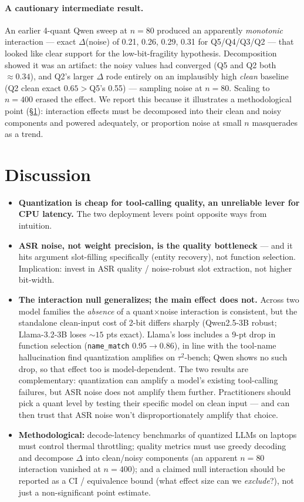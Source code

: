 \documentclass[11pt]{article}
\newcommand{\code}[1]{\texttt{#1}}
\begin{document}
\paragraph{A cautionary intermediate result.} An earlier 4-quant Qwen sweep at
$n{=}80$ produced an apparently \emph{monotonic} interaction --- exact $\Delta$(noise)
of 0.21, 0.26, 0.29, 0.31 for Q5/Q4/Q3/Q2 --- that looked like clear support for the
low-bit-fragility hypothesis. Decomposition showed it was an artifact: the noisy values
had converged (Q5 and Q2 both ${\approx}0.34$), and Q2's larger $\Delta$ rode entirely
on an implausibly high \emph{clean} baseline (Q2 clean exact $0.65 > {}$Q5's 0.55) ---
sampling noise at $n{=}80$. Scaling to $n{=}400$ erased the effect. We report this
because it illustrates a methodological point (\S\ref{sec:disc}): interaction effects
must be decomposed into their clean and noisy components and powered adequately, or
proportion noise at small $n$ masquerades as a trend.

\section{Discussion}
\label{sec:disc}
\begin{itemize}
\item \textbf{Quantization is cheap for tool-calling quality, an unreliable lever for
CPU latency.} The two deployment levers point opposite ways from intuition.
\item \textbf{ASR noise, not weight precision, is the quality bottleneck} --- and it
hits argument slot-filling specifically (entity recovery), not function selection.
Implication: invest in ASR quality / noise-robust slot extraction, not higher
bit-width.
\item \textbf{The interaction null generalizes; the main effect does not.} Across two
model families the \emph{absence} of a quant$\times$noise interaction is consistent, but
the standalone clean-input cost of 2-bit differs sharply (Qwen2.5-3B robust;
Llama-3.2-3B loses ${\sim}15$ pts exact). Llama's loss includes a 9-pt drop in
function selection (\code{name\_match} $0.95\rightarrow0.86$), in line with the
tool-name hallucination \citet{jang2026} find quantization amplifies on
$\tau^2$-bench; Qwen shows no such drop, so that effect too is model-dependent.
The two results are complementary: quantization can amplify a model's existing
tool-calling failures, but ASR noise does not amplify them further. Practitioners
should pick a quant level by
testing their specific model on clean input --- and can then trust that ASR noise won't
disproportionately amplify that choice.
\item \textbf{Methodological:} decode-latency benchmarks of quantized LLMs on laptops
must control thermal throttling; quality metrics must use greedy decoding and decompose
$\Delta$ into clean/noisy components (an apparent $n{=}80$ interaction vanished at
$n{=}400$); and a claimed null interaction should be reported as a CI / equivalence
bound (what effect size can we \emph{exclude}?), not just a non-significant point
estimate.
\end{itemize}
\end{document}
